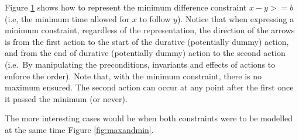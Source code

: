 \documentclass
[a4paper
,english
,parskip=half
,bibliography=totoc
]{scrreprt}
\begin{document}
        
        Figure \ref{fig:minimum} shows how to represent the minimum difference constraint \(x-y>=b\) (i.e, the minimum time allowed for \(x\) to follow \(y\)). Notice that when expressing a minimum constraint, regardless of the representation, the direction of the arrows is from the first action to the start of the durative (potentially dummy) action, and from the end of durative (potentially dummy) action to the second action (i.e.\ By manipulating the preconditions, invariants and effects of actions to enforce the order). Note that, with the minimum constraint, there is no maximum ensured. The second action can occur at any point after the first once it passed the minimum (or never).

        \begin{figure}[h]
                \hfill
                \vfill
                \centering 
                \caption{}
                \label{fig:minimum_compact}
        \label{fig:minimum}
        \end{figure}


        The more interesting cases would be when both constraints were to be modelled at the same time Figure \ref{fig:maxandmin}. 
\end{document}

